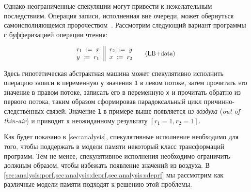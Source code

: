 Однако неограниченные спекуляции могут привести 
к нежелательным последствиям. 
Операция записи, исполненная вне очереди, может обернуться
самоисполняющемся пророчеством~\cite{Boehm-Demsky:MSPC14}. 
Рассмотрим следующий вариант программы с буфферизацией операции чтения:

\begin{equation*}
\small
\inarrII{
  \readInst{}{r_1}{x}   \\
  \writeInst{}{y}{r_1}  \\
}{
  \readInst{}{r_2}{y}   \\
  \writeInst{}{x}{r_2}  \\
}
\tag{LB+data}\label{ex:lb+data}
\end{equation*}

Здесь гипотетическая абстрактная машина 
может спекулятивно исполнить операцию записи в переменную \texttt{y}
значения \texttt{1} в левом потоке, 
затем прочитать это значение в правом потоке, 
записать его в переменную \texttt{x} и прочитать обратно из 
первого потока, таким образом сформировав парадоксальный цикл 
причинно-следственных связей.  
Значение \texttt{1} в примере выше появляется \emph{из воздуха}
(\emph{out of thin-air}) и приводит 
к неожиданному результату ${[r_1=1, r_2=1]}$.

Как будет показано в \cref{sec:analysis},
спекулятивные исполнение необходимо для того, чтобы 
поддержать в модели памяти некоторый класс трансформаций программ. 
Тем не менее, спекулятивное исполнения необходимо 
ограничить должным образом, чтобы избежать 
появление значений из воздуха. 
В \cref{sec:analysis:porf,sec:analysis:deprf,sec:analysis:sdeprf}
мы рассмотрим как различные модели памяти подходят 
к решению этой проблемы. 

